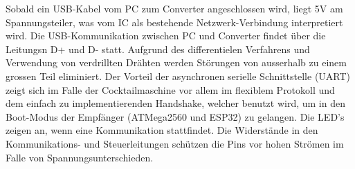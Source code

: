 Sobald ein USB-Kabel vom PC zum Converter angeschlossen wird, liegt 5V am Spannungsteiler, was vom IC als bestehende Netzwerk-Verbindung interpretiert wird. Die USB-Kommunikation zwischen PC und Converter findet über die Leitungsn D+ und D- statt. Aufgrund des differentielen Verfahrens und Verwendung von verdrillten Drähten werden Störungen von ausserhalb zu einem grossen Teil eliminiert. Der Vorteil der asynchronen serielle Schnittstelle (UART) zeigt sich im Falle der Cocktailmaschine vor allem im flexiblem Protokoll und dem einfach zu implementierenden Handshake, welcher benutzt wird, um in den Boot-Modus der Empfänger (ATMega2560 und ESP32) zu gelangen. Die LED's zeigen an, wenn eine Kommunikation stattfindet. Die Widerstände in den Kommunikations- und Steuerleitungen schützen die Pins vor hohen Strömen im Falle von Spannungsunterschieden.